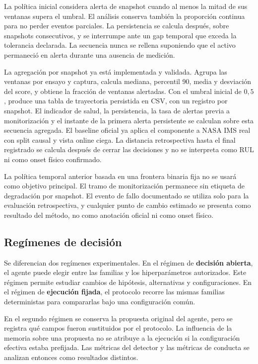 La política inicial considera alerta de snapshot cuando al menos la mitad de
sus ventanas supera el umbral. El análisis conserva también la proporción
continua para no perder eventos parciales. La persistencia se calcula después,
sobre snapshots consecutivos, y se interrumpe ante un gap temporal que exceda
la tolerancia declarada. La secuencia nunca se rellena suponiendo que el activo
permaneció en alerta durante una ausencia de medición.

La agregación por snapshot ya está implementada y validada. Agrupa las ventanas
por ensayo y captura, calcula mediana, percentil 90, media y desviación del
score, y obtiene la fracción de ventanas alertadas. Con el umbral inicial de
$0{,}5$, produce una tabla de trayectoria persistida en CSV, con un registro
por snapshot. El
indicador de salud, la persistencia, la tasa de alertas previa a monitorización
y el instante de la primera alerta persistente se calculan sobre esta secuencia
agregada. El baseline oficial ya aplica el componente a NASA IMS real con split
causal y vista online ciega. La distancia retrospectiva hasta el final
registrado se calcula después de cerrar las decisiones y no se interpreta como
RUL ni como onset físico confirmado.

La política temporal anterior basada en una frontera binaria fija no se usará
como objetivo principal. El tramo de monitorización permanece sin etiqueta de
degradación por snapshot. El evento de fallo documentado se utiliza solo para
la evaluación retrospectiva, y cualquier punto de cambio estimado se presenta
como resultado del método, no como anotación oficial ni como onset físico.

\subsection{Regímenes de decisión}

Se diferencian dos regímenes experimentales. En el régimen de
\textbf{decisión abierta}, el agente puede elegir entre las familias y los
hiperparámetros autorizados. Este régimen permite estudiar cambios de hipótesis,
alternativas y configuraciones. En el régimen de \textbf{ejecución fijada}, el
protocolo recorre las mismas familias deterministas para compararlas bajo una
configuración común.

En el segundo régimen se conserva la propuesta original del agente, pero se
registra qué campos fueron sustituidos por el protocolo. La influencia de la
memoria sobre una propuesta no se atribuye a la ejecución si la configuración
efectiva estaba prefijada. Las métricas del detector y las métricas de conducta
se analizan entonces como resultados distintos.


